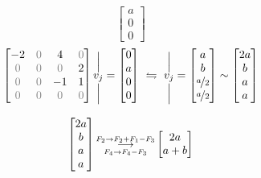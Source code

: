 {{\[\begin{bmatrix}
    a \\ 
    0 \\
    0
    \end{bmatrix}
    \] 
\[\begin{bmatrix}
    -2 & \textcolor{gray}{0} & 4 & \textcolor{gray}{0} \\
    \textcolor{gray}{0} & \textcolor{gray}{0} &  \textcolor{gray}{0} & 2\\
    \textcolor{gray}{0} & \textcolor{gray}{0} & -1 & 1 \\
    \textcolor{gray}{0} & \textcolor{gray}{0} & \textcolor{gray}{0} & \textcolor{gray}{0} 
\end{bmatrix}
\overset{\Big|}{\underset{\Big|}{v_j}}
= \begin{bmatrix}
    0 \\ a \\ 0 \\ 0
\end{bmatrix} \ \leftrightharpoons \ 
\overset{\Big|}{\underset{\Big|}{v_j}}
= \begin{bmatrix}
    a \\ b \\ \nicefrac{a}{2}\\ \nicefrac{a}{2} \end{bmatrix}   \sim \begin{bmatrix}
    2a \\ b \\ a\\ a \end{bmatrix}  
\] 
\par\noindent{}
\[ \begin{bmatrix}
    2a \\ 
    b \\ 
    a \\
    a
    \end{bmatrix} 
    \text{\small $ \underset{F_4 \to F_4 - F_3}{\overset{F_2 \to F_2 + F_1-F_3}{\longrightarrow }} $}
    \begin{bmatrix}
    2a \\ 
    a+b \\ 

\end{bmatrix}\]}}
